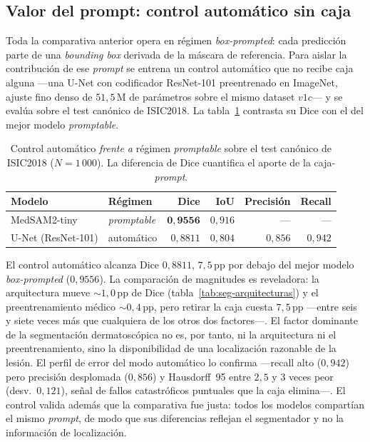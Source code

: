 \subsection{Valor del prompt: control automático sin caja}
\label{sec:seg-control-automatico}

Toda la comparativa anterior opera en régimen \emph{box-prompted}:
cada predicción parte de una \emph{bounding box} derivada de la
máscara de referencia. Para aislar la contribución de ese
\emph{prompt} se entrena un control automático que no recibe caja
alguna ---una U-Net con codificador ResNet-101 preentrenado en
ImageNet, ajuste fino denso de $51{,}5$\,M de parámetros sobre el
mismo dataset $v1c$--- y se evalúa sobre el test canónico de
ISIC2018. La tabla~\ref{tab:seg-automatico} contrasta su Dice con el
del mejor modelo \emph{promptable}.

\begin{table}[H]
\centering
\footnotesize
\setlength{\tabcolsep}{4pt}
\renewcommand{\arraystretch}{0.95}
\caption{Control automático \emph{frente a} régimen
\emph{promptable} sobre el test canónico de ISIC2018
($N = 1\,000$). La diferencia de Dice cuantifica el aporte
de la caja-\emph{prompt}.}
\label{tab:seg-automatico}
\begin{tabular}{llrrrr}
\hline
Modelo & Régimen & Dice & IoU & Precisión & Recall \\
\hline
MedSAM2-tiny      & \emph{promptable} & $\mathbf{0{,}9556}$ & $0{,}916$ & --- & --- \\
U-Net (ResNet-101) & automático        & $0{,}8811$ & $0{,}804$ & $0{,}856$ & $0{,}942$ \\
\hline
\end{tabular}
\end{table}

El control automático alcanza Dice $0{,}8811$, $7{,}5$\,pp por debajo
del mejor modelo \emph{box-prompted} ($0{,}9556$). La comparación de
magnitudes es reveladora: la arquitectura mueve $\sim 1{,}0$\,pp de
Dice (tabla~\ref{tab:seg-arquitecturas}) y el preentrenamiento médico
$\sim 0{,}4$\,pp, pero retirar la caja cuesta $7{,}5$\,pp ---entre
seis y siete veces más que cualquiera de los otros dos factores---. El
factor dominante de la segmentación dermatoscópica no es, por tanto,
ni la arquitectura ni el preentrenamiento, sino la disponibilidad de
una localización razonable de la lesión. El perfil de error del modo automático lo confirma
---recall alto ($0{,}942$) pero precisión desplomada ($0{,}856$) y
Hausdorff~95 entre $2{,}5$ y $3$ veces peor (desv.\ $0{,}121$), señal
de fallos catastróficos puntuales que la caja elimina---. El control
valida además que la comparativa fue justa: todos los modelos
compartían el mismo \emph{prompt}, de modo que sus diferencias
reflejan el segmentador y no la información de localización.

